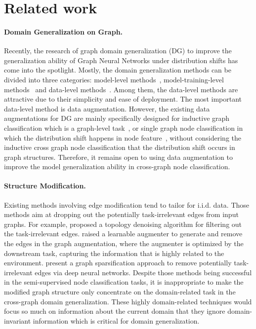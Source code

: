 
\section{Related work}
\paragraph{Domain Generalization on Graph.}
Recently, the research of graph domain generalization (DG) to improve the generalization ability of Graph Neural Networks under distribution shifts has come into the spotlight.
Mostly, the domain generalization methods can be divided into three categories\cite{li2022out}:
model-level methods~\cite{li2021disentangled,li2022ood}, model-training-level methods~\cite{liu2022confidence,wu2022discovering} and data-level methods~\cite{rongdropedge,you2020graph}. Among them, the data-level methods are attractive  due to their simplicity and ease of deployment. The most important data-level method is data augmentation.
However, the existing data augmentations for DG are mainly specifically designed for inductive graph classification which is a graph-level task~\cite{kong2020flag}, or single graph node classification in which the distribution shift happens in node feature~\cite{park2021metropolis}, without considering the inductive cross graph node classification that the distribution shift occurs in graph structures. Therefore, it remains open to using data augmentation to improve the model generalization ability in cross-graph node classification.


\paragraph{Structure Modification.}
Existing methods involving edge modification tend to tailor for i.i.d. data. Those methods aim at dropping out the potentially
task-irrelevant edges from input graphs. For example, \citet{luo2021learning} proposed a topology denoising algorithm for filtering out the task-irrelevant edges. \citet{zhao2021data} raised a 
 learnable augmenter to generate and remove the edges in the graph augmentation, where the augmenter is  optimized by the downstream task, capturing the information that is highly related to 
the environment. \citet{zheng2020robust} present a graph sparsification approach to remove potentially task-irrelevant edges via deep neural networks. Despite those methods being successful in the semi-supervised node classification tasks,
it is inappropriate to make the modified graph structure only concentrate on the domain-related task in the cross-graph domain generalization. 
These highly domain-related techniques  would focus so much on information about the current domain that they ignore domain-invariant information which is critical for domain generalization.



